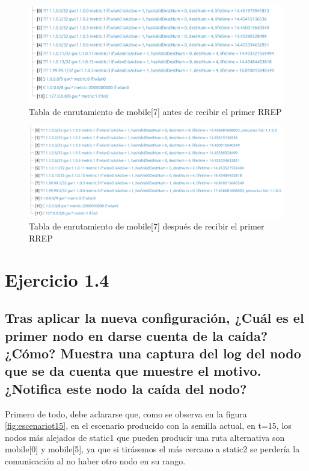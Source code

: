 \begin{figure}[H]
    \centering
    \includegraphics[width=125mm, scale=0.75]{imaxes/aodv/ejercicio3_1.png}
    \caption{Tabla de enrutamiento de mobile[7] antes de recibir el primer RREP}
    \label{fig:rtable_prev_mob7RREP}
\end{figure}

\begin{figure}[H]
    \centering
    \includegraphics[width=125mm, scale=0.75]{imaxes/aodv/ejercicio3_2.png}
    \caption{Tabla de enrutamiento de mobile[7] después de recibir el primer RREP}
    \label{fig:rtable_post_mob7RREP}
\end{figure}

\vspace{1.25cm}
\section{Ejercicio 1.4}

\subsection{Tras aplicar la nueva configuración, ¿Cuál es el primer nodo en darse cuenta de la caída? ¿Cómo? Muestra una captura del log del nodo que se da cuenta que muestre el motivo. ¿Notifica este nodo la caída del nodo?}

Primero de todo, debe aclararse que, como se observa en la figura \ref{fig:escenariot15}, en el escenario producido con la semilla actual, en t=15, los nodos más alejados de static1 que pueden producir una ruta alternativa son mobile[0] y mobile[5], ya que si tirásemos el más cercano a static2 se perdería la comunicación al no haber otro nodo en su rango.

